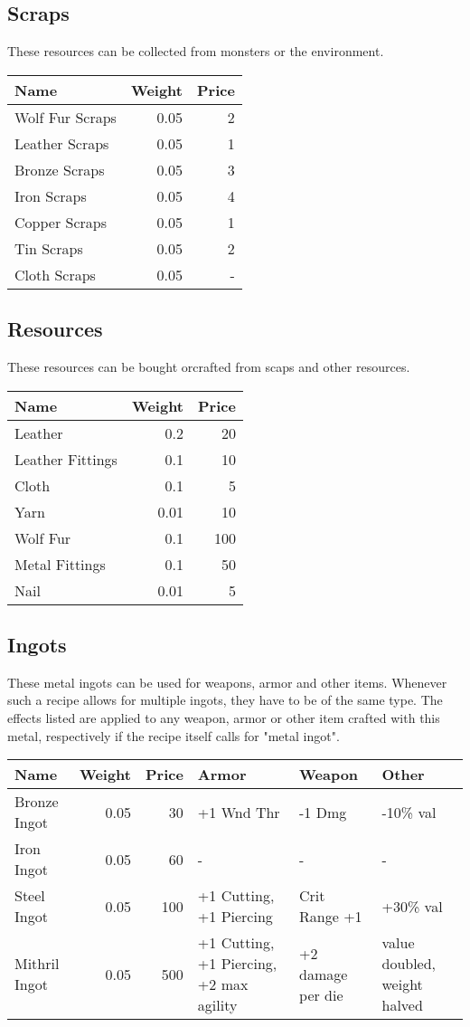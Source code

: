 \subsection{Scraps}
These resources can be collected from monsters or the environment.
\begin{longtable}{l | r | r }
	Name & Weight & Price\\ \hline
	Wolf Fur Scraps & 0.05 & 2\\
	Leather Scraps & 0.05 & 1\\
	Bronze Scraps & 0.05 & 3\\
	Iron Scraps & 0.05 & 4\\
	Copper Scraps & 0.05 & 1\\
	Tin Scraps & 0.05 & 2\\
	Cloth Scraps & 0.05 & -\\ 
\end{longtable}

\subsection{Resources}
These resources can be bought orcrafted from scaps and other resources.
\begin{longtable}{l | r | r }
	Name & Weight & Price\\ \hline
	Leather & 0.2 & 20\\
	Leather Fittings & 0.1 & 10\\
	Cloth & 0.1 & 5\\
	Yarn & 0.01 & 10\\
	Wolf Fur & 0.1 & 100\\
	Metal Fittings & 0.1 & 50\\
	Nail & 0.01 & 5\\
\end{longtable}

\subsection{Ingots}
These metal ingots can be used for weapons, armor and other items. Whenever such a recipe allows for multiple ingots, they have to be of the same type. The effects listed are applied to any weapon, armor or other item crafted with this metal, respectively if the recipe itself calls for "metal ingot".
\begin{longtable}{l | r | r | p{2cm} | p{2cm} | p{2cm}}
	Name & Weight & Price & Armor & Weapon & Other\\ \hline
	Bronze Ingot & 0.05 & 30 & +1 Wnd Thr & -1 Dmg & -10\% val\\
	Iron Ingot & 0.05 & 60 & - & - & -\\
	Steel Ingot & 0.05 & 100 & +1 Cutting, +1 Piercing & Crit Range +1 & +30\% val\\
	Mithril  Ingot & 0.05 & 500 & +1 Cutting, +1 Piercing, +2 max agility & +2 damage per die & value doubled, weight halved\\ 
\end{longtable}

